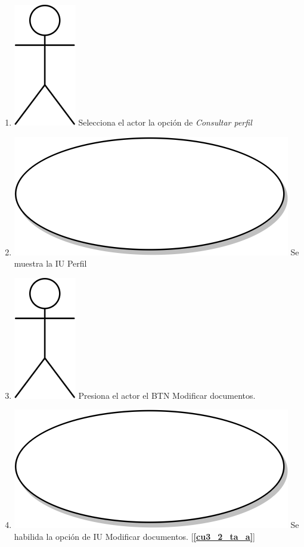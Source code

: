 \begin{enumerate}
\item {\includegraphics[scale=.1]{Capitulo3/img/actor.png} Selecciona el actor la opción de \textit{Consultar perfil}}
\item {\includegraphics[scale=.05]{Capitulo3/img/proceso.png} Se muestra la IU Perfil}
\item {\includegraphics[scale=.1]{Capitulo3/img/actor.png} Presiona el actor el BTN Modificar documentos.}
\item {\includegraphics[scale=.05]{Capitulo3/img/proceso.png} Se habilida la opción de IU Modificar documentos. [\textbf{\ref{cu3_2_ta_a}}]}

\end{enumerate}
